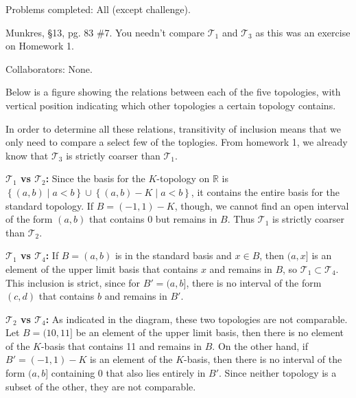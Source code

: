 \documentclass[10pt]{report}
\begin{document}
{\color{red}Problems completed: All (except challenge).}

\begin{exer}[6 points]
	Munkres, \S 13, pg. 83 \#7. You needn't compare $\mathcal{T}_1$ and $\mathcal{T}_3$ as this was an exercise on Homework 1.
\end{exer}
{\color{blue}Collaborators: None.}

Below is a figure showing the relations between each of the five topologies, with vertical position indicating which other topologies a certain topology contains.

\begin{figure}[H]
\centering	
{}
\end{figure}

In order to determine all these relations, transitivity of inclusion means that we only need to compare a select few of the toplogies. From homework 1, we already know that $\mathcal{T}_3$ is strictly coarser than $\mathcal{T}_1$.

\textbf{$\mathcal{T}_1$ vs $\mathcal{T}_2$:} Since the basis for the $K$-topology on $\mathbb{R}$ is $\left\{ (a,b) \;|\; a<b \right\} \cup \left\{ (a,b)-K \;|\; a<b \right\}$, it contains the entire basis for the standard topology. If $B=(-1,1) - K$, though, we cannot find an open interval of the form $(a,b)$ that contains $0$ but remains in $B$. Thus $\mathcal{T}_1$ is strictly coarser than $\mathcal{T}_2$.

\textbf{$\mathcal{T}_1$ vs $\mathcal{T}_4$:} If $B=(a,b)$ is in the standard basis and $x \in B$, then $(a,x]$ is an element of the upper limit basis that contains $x$ and remains in $B$, so $\mathcal{T}_1 \subset \mathcal{T}_4$. This inclusion is strict, since for $B'=(a,b]$, there is no interval of the form $(c,d)$ that contains $b$ and remains in $B'$.

\textbf{$\mathcal{T}_2$ vs $\mathcal{T}_4$:} As indicated in the diagram, these two topologies are not comparable. Let $B=(10,11]$ be an element of the upper limit basis, then there is no element of the $K$-basis that contains 11 and remains in $B$. On the other hand, if $B'=(-1,1)-K$ is an element of the $K$-basis, then there is no interval of the form $(a,b]$ containing 0 that also lies entirely in $B'$. Since neither topology is a subset of the other, they are not comparable.
\end{document}
